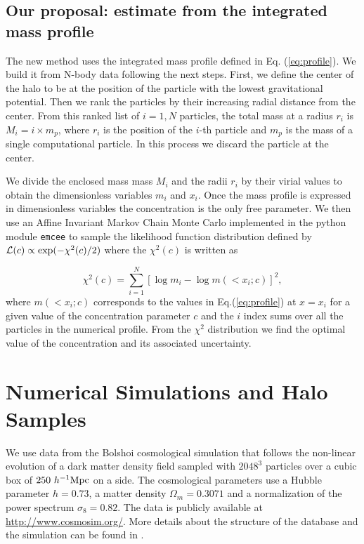 \documentclass{emulateapj}
\newcommand{\hMpc}{{\ifmmode{h^{-1}{\rm Mpc}}\else{$h^{-1}$Mpc}\fi}}
\begin{document}
\subsection{Our proposal: estimate from the integrated mass profile}

The new method uses the integrated mass profile defined in
Eq. (\ref{eq:profile}).  We build it from N-body data following the
next steps.  First, we define the center of the halo to be at the
position of the particle with the lowest gravitational potential.
Then we rank the particles by their increasing radial distance from
the center.  From this ranked list of $i=1,N$ particles, the total
mass at a radius $r_i$ is $M_i=i\times m_p$, where $r_i$ is the
position of the $i$-th particle and $m_p$ is the mass of a single
computational particle.  In this process we discard the particle at
the center.

We divide the enclosed mass mass $M_i$ and the radii $r_i$ by their
virial values to obtain the dimensionless variables $m_i$ and $x_i$.
Once the mass profile is expressed in dimensionless variables the
concentration is the only free parameter.  We then use an Affine
Invariant Markov Chain Monte Carlo implemented in the python module
{\texttt{emcee}} \citep{emcee} to sample the likelihood function
distribution defined by ${\cal L}(c)\propto \exp(-\chi^2(c)/2)$ where
the $\chi^2(c)$ is written as

\begin{equation}
\chi^2(c)= \sum_{i=1}^{N}[\log m_i - \log m(< x_i;c)]^2,
\end{equation}
%
where $m(<x_i;c)$ corresponds to the values in Eq.(\ref{eq:profile})
at $x=x_i$ for a given value of the concentration parameter $c$ and
the $i$ index sums over all the particles in the numerical profile.
From the $\chi^2$ distribution we find the optimal value of the
concentration and its associated uncertainty.


\section{Numerical Simulations and Halo Samples}



We use data from the Bolshoi cosmological simulation that follows the
non-linear evolution of a dark matter density field sampled with
$2048^3$ particles over a cubic box of $250\ \hMpc$ on a side.  
The cosmological parameters use a Hubble parameter $h=0.73$, a matter density
$\Omega_m=0.3071$ and a normalization of the power spectrum
$\sigma_8=0.82$. 
The
data is publicly available at \url{http://www.cosmosim.org/}.  More
details about the structure of the database and the simulation can be
found in \citep{2013AN....334..691R}.
\end{document}
